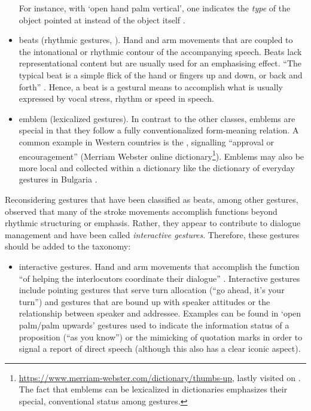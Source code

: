 \documentclass[output=paper,biblatex,babelshorthands,newtxmath,draftmode,colorlinks,citecolor=brown]{langscibook}
\begin{document}
\begin{itemize}
%
For instance, with \enquote*{open hand palm vertical}, one indicates the \emph{type} of the object pointed at instead of the object itself \citep[]{Kendon:Versante:2003}.
\largerpage[1]
\item beats (rhythmic gestures, ). Hand and arm movements that are coupled to the intonational or rhythmic contour of the accompanying speech. Beats lack representational content but are usually used for an emphasising effect. \enquote{The typical beat is a simple flick of the hand or fingers up and down, or back and forth} \citep[]{McNeill:1992}. Hence, a beat is a gestural means to accomplish what is usually expressed by vocal stress, rhythm or speed in speech. 
\item emblem (lexicalized gestures). In contrast to the other classes, emblems are special in that they follow a fully conventionalized form-meaning relation. A common example in Western countries is the , signalling \enquote{approval or encouragement} (Merriam Webster online dictionary\footnote{\url{https://www.merriam-webster.com/dictionary/thumbs-up}, lastly visited on . The fact that emblems can be lexicalized in dictionaries emphasizes their special, conventional status among gestures.}). Emblems may also be more local and collected within a dictionary like the dictionary of everyday gestures in Bulgaria \citep{Kolarova:2011}.
\end{itemize}


Reconsidering gestures that have been classified as beats, among other gestures, \citet{Bavelas:Chovil:Lawrie:Wade:1992} observed that many of the stroke movements accomplish functions beyond rhythmic structuring or emphasis.
%
Rather, they appear to contribute to dialogue management and have been called \emph{interactive gestures}.
%
Therefore, these gestures should be added to the taxonomy:

\begin{itemize}
\item interactive gestures. Hand and arm movements that accomplish the function \enquote{of helping the interlocutors coordinate their dialogue} \citep[]{Bavelas:Chovil:Coates:Roe:1995}. Interactive gestures include pointing gestures that serve turn allocation (\enquote{go ahead, it's your turn}) and gestures that are bound up with speaker attitudes or the relationship between speaker and addressee. Examples can be found in \enquote*{open palm/palm upwards} gestures used to indicate the information status of a proposition (\enquote{as you know}) or the mimicking of quotation marks in order to signal a report of direct speech (although this also has a clear iconic aspect).
\end{itemize}
\end{document}
